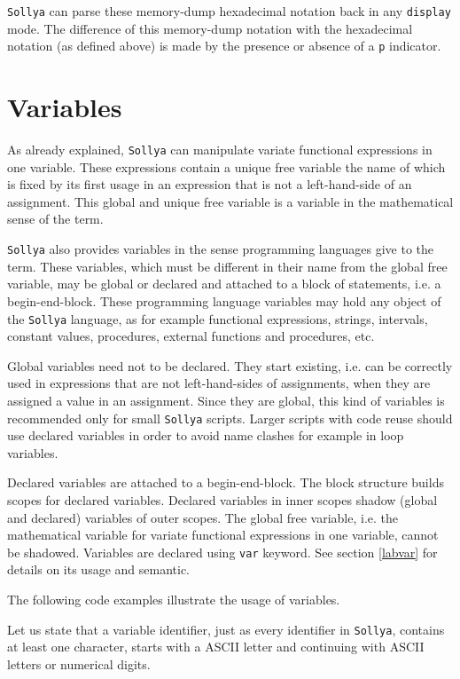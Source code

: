 \documentclass[a4paper]{article}
\newcommand{\key}[1]{\texttt{#1}}
\newcommand{\sollya}{\texttt{Sollya}\xspace}
\begin{document}


\sollya can parse these memory-dump hexadecimal notation back in any
\key{display} mode. The difference of this memory-dump
notation with the hexadecimal notation (as defined above) is made by
the presence or absence of a \texttt{p} indicator.

\section{Variables}\label{variables}

As already explained, \sollya can manipulate variate functional
expressions in one variable. These expressions contain a unique free variable the name
of which is fixed by its first usage in an expression that is not a
left-hand-side of an assignment. This global and unique free variable is 
a variable in the mathematical sense of the term. 

\sollya also provides variables in the sense programming languages
give to the term.  These variables, which must be different in their
name from the global free variable, may be global or declared and
attached to a block of statements, i.e. a begin-end-block. These
programming language variables may hold any object of the \sollya
language, as for example functional expressions, strings, intervals,
constant values, procedures, external functions and procedures, etc.

Global variables need not to be declared. They start existing,
i.e. can be correctly used in expressions that are not left-hand-sides
of assignments, when they are assigned a value in an assignment. Since
they are global, this kind of variables is recommended only for small
\sollya scripts.  Larger scripts with code reuse should use
declared variables in order to avoid name clashes for example in loop
variables.

Declared variables are attached to a begin-end-block. The block
structure builds scopes for declared variables. Declared variables in
inner scopes shadow (global and declared) variables of outer
scopes. The global free variable, i.e. the mathematical variable for
variate functional expressions in one variable, cannot be shadowed. Variables are
declared using \key{var} keyword. See section \ref{labvar} for details
on its usage and semantic.

The following code examples illustrate the usage of variables.




Let us state that a variable identifier, just as every identifier in
\sollya, contains at least one character, starts with a ASCII letter
and continuing with ASCII letters or numerical digits.
\end{document}
